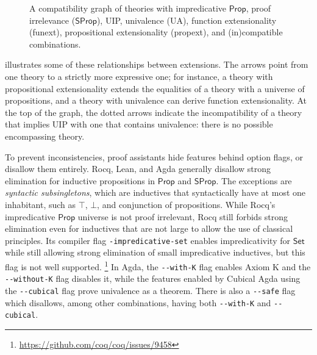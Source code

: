 \documentclass{article}
\newcommand{\kw}[1]{\mathsf{#1}}
\newcommand{\code}[1]{\texttt{#1}}
\begin{document}
\begin{figure}[ht]
\centering
{}
\caption{A compatibility graph of theories with impredicative $\kw{Prop}$, proof irrelevance ($\kw{SProp}$),
  UIP, univalence (UA), function extensionality (funext), propositional extensionality (propext),
  and (in)compatible combinations.}
\label{fig:lattice}
\end{figure}

 illustrates some of these relationships between extensions.
The arrows point from one theory to a strictly more expressive one;
for instance, a theory with propositional extensionality extends the equalities
of a theory with a universe of propositions,
and a theory with univalence can derive function extensionality.
At the top of the graph, the dotted arrows indicate
the incompatibility of a theory that implies UIP with one that contains univalence:
there is no possible encompassing theory.

To prevent inconsistencies, proof assistants hide features behind option flags,
or disallow them entirely.
Rocq, Lean, and Agda generally disallow strong elimination for inductive propositions
in $\kw{Prop}$ and $\kw{SProp}$.
The exceptions are \emph{syntactic subsingletons},
which are inductives that syntactically have at most one inhabitant,
such as $\top$, $\bot$, and conjunction of propositions.
While Rocq's impredicative $\kw{Prop}$ universe is not proof irrelevant,
Rocq still forbids strong elimination even for inductives that are not large
to allow the use of classical principles.
Its compiler flag \code{-impredicative-set} enables impredicativity for $\kw{Set}$
while still allowing strong elimination of small impredicative inductives,
but this flag is not well supported.%
\footnote{\url{https://github.com/coq/coq/issues/9458}}
In Agda, the \code{-{}-with-K} flag enables Axiom K
and the \code{-{}-without-K} flag disables it,
while the features enabled by Cubical Agda using the \code{-{}-cubical} flag
prove univalence as a theorem.
There is also a \code{-{}-safe} flag which disallows,
among other combinations,
having both \code{-{}-with-K} and \code{-{}-cubical}.
\end{document}
